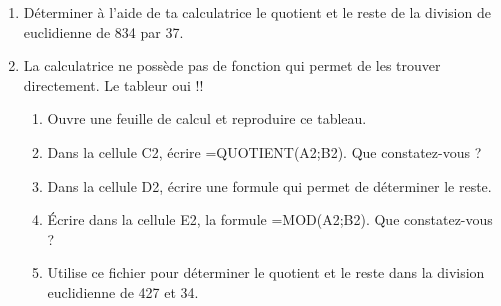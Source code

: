 
\begin{enumerate}
\item Déterminer à l'aide de ta calculatrice le quotient et le reste de la division de euclidienne de 834 par 37.
\item La calculatrice ne possède pas de fonction qui permet de les trouver directement. Le tableur oui !!
\begin{enumerate}
\item Ouvre une feuille de calcul et reproduire ce tableau.
\item Dans la cellule C2, écrire =QUOTIENT(A2;B2). Que constatez-vous ?
\item Dans la cellule D2, écrire une formule qui permet de déterminer le reste.
\item Écrire dans la cellule E2, la formule =MOD(A2;B2). Que constatez-vous ?
\item Utilise ce fichier pour déterminer le quotient et le reste dans la division euclidienne de 427 et 34.
\end{enumerate}
\end{enumerate}